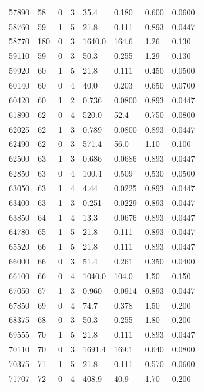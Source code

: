\documentclass[preview]{standalone}
\begin{document}
{{{{\begin{tabular}{L{1.2cm}C{1.2cm} C{0.3cm}C{0.5cm} C{1.4cm}C{1.4cm} C{1.4cm}C{1.4cm}}
  57890  &    58  & 0     &  3 &  35.4  & 0.180  & 0.600 &  0.0600   \\ 
  58760  &    59  & 1     &  5 &  21.8  & 0.111  & 0.893 &  0.0447   \\ 
  58770  &   180  & 0     &  3 &  1640.0  & 164.6  & 1.26 &  0.130   \\ 
  59110  &    59  & 0     &  3 &  50.3  & 0.255  & 1.29 &  0.130   \\ 
  59920  &    60  & 1     &  5 &  21.8  & 0.111  & 0.450 &  0.0500   \\ 
  60140  &    60  & 0     &  4 &  40.0  & 0.203  & 0.650 &  0.0700   \\ 
  60420  &    60  & 1     &  2 &  0.736  & 0.0800  & 0.893 &  0.0447   \\ 
  61890  &    62  & 0     &  4 &  520.0  & 52.4  & 0.750 &  0.0800   \\ 
  62025  &    62  & 1     &  3 &  0.789  & 0.0800  & 0.893 &  0.0447   \\ 
  62490  &    62  & 0     &  3 &  571.4  & 56.0  & 1.10 &  0.100   \\ 
  62500  &    63  & 1     &  3 &  0.686  & 0.0686  & 0.893 &  0.0447   \\ 
  62850  &    63  & 0     &  4 &  100.4  & 0.509  & 0.530 &  0.0500   \\ 
  63050  &    63  & 1     &  4 &  4.44  & 0.0225  & 0.893 &  0.0447   \\ 
  63400  &    63  & 1     &  3 &  0.251  & 0.0229  & 0.893 &  0.0447   \\ 
  63850  &    64  & 1     &  4 &  13.3  & 0.0676  & 0.893 &  0.0447   \\ 
  64780  &    65  & 1     &  5 &  21.8  & 0.111  & 0.893 &  0.0447   \\ 
  65520  &    66  & 1     &  5 &  21.8  & 0.111  & 0.893 &  0.0447   \\ 
  66000  &    66  & 0     &  3 &  51.4  & 0.261  & 0.350 &  0.0400   \\ 
  66100  &    66  & 0     &  4 &  1040.0  & 104.0  & 1.50 &  0.150   \\ 
  67050  &    67  & 1     &  3 &  0.960  & 0.0914  & 0.893 &  0.0447   \\ 
  67850  &    69  & 0     &  4 &  74.7  & 0.378  & 1.50 &  0.200   \\ 
  68375  &    68  & 0     &  3 &  50.3  & 0.255  & 1.80 &  0.200   \\ 
  69555  &    70  & 1     &  5 &  21.8  & 0.111  & 0.893 &  0.0447   \\ 
  70110  &    70  & 0     &  3 &  1691.4  & 169.1  & 0.640 &  0.0800   \\ 
  70375  &    71  & 1     &  5 &  21.8  & 0.111  & 0.570 &  0.0600   \\ 
  71707  &    72  & 0     &  4 &  408.9  & 40.9  & 1.70 &  0.200   \\ 
\hline 
\end{tabular} 

}}}}
\end{document}
